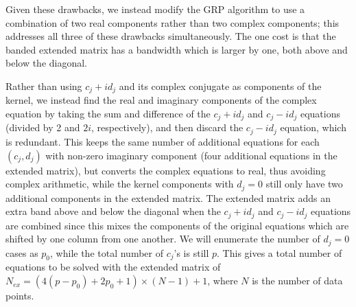 \documentclass[manuscript, letterpaper]{aastex6}
\begin{document}
Given these drawbacks, we instead modify the GRP algorithm to use a combination of two real
components rather than two complex components;  this addresses all three of these drawbacks
simultaneously.  The one cost is that the banded extended matrix has a bandwidth which is
larger by one, both above and below the diagonal.

Rather than using $c_j+id_j$ and its complex conjugate as components of the kernel, we instead
find the real and imaginary components of the complex equation by taking the
sum and difference of the $c_j+id_j$ and $c_j-id_j$ equations (divided by 2 and $2i$, respectively),
and then discard the $c_j-id_j$ equation, which is redundant.  This keeps the same number of
additional equations for each $(c_j,d_j)$ with non-zero imaginary component (four additional
equations in the extended matrix), but converts the complex equations to real, thus avoiding
complex arithmetic, while the kernel components with $d_j=0$ still only have two
additional components in the extended matrix.  The extended matrix adds an extra band above
and below the diagonal when the $c_j+id_j$ and $c_j-id_j$ equations are combined since this
mixes the components of the original equations which are shifted by one column from one
another.  We will enumerate the number of $d_j=0$ cases as $p_0$, while the total number
of $c_j$'s is still $p$.  This gives a total number of equations to be solved with the
extended matrix of $N_{ex}= (4(p-p_0)+2p_0+1)\times(N-1)+1$, where $N$ is the number of data
points.
\end{document}
